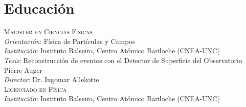 \section*{Educación}
\noindent
\textsc{Magister en Ciencias Físicas}\\
{\emph{Orientación}}: Física de Partículas y Campos\\
{\emph{Institución}}: Instituto Balseiro, Centro Atómico Bariloche (CNEA-UNC)\\
{\emph{Tesis}}: Reconstrucción de eventos con el Detector de Superficie del Observatorio Pierre Auger\\
{\emph{Director}}: Dr. Ingomar Allekotte\\ 
\textsc{Licenciado en Física}\\
{\emph{Institución}}: Instituto Balseiro, Centro Atómico Bariloche (CNEA-UNC)\\
\fi
